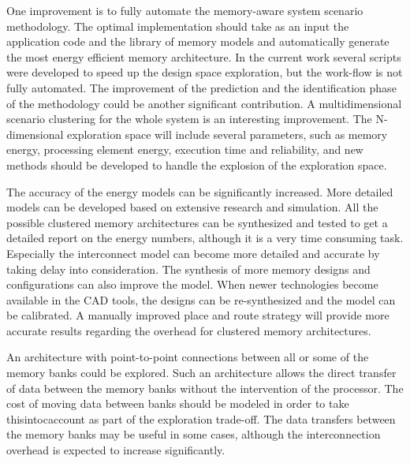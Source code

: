 One improvement is to fully automate the memory-aware system scenario methodology.
The optimal implementation should take as an input the application code and the library of memory models and automatically generate the most energy efficient memory architecture.
In the current work several scripts were developed to speed up the design space exploration, but the work-flow is not fully automated.
The improvement of the prediction and the identification phase of the methodology could be another significant contribution. 
A multidimensional scenario clustering for the whole system is an interesting improvement.
The N-dimensional exploration space will include several parameters, such as memory energy, processing element energy, execution time and reliability, and new methods should be developed to handle the explosion of the exploration space.

The accuracy of the energy models can be significantly increased.
More detailed models can be developed based on extensive research and simulation.
All the possible clustered memory architectures can be synthesized and tested to get a detailed report on the energy numbers, although it is a very time consuming task.
Especially the interconnect model can become more detailed and accurate by taking delay into consideration.
The synthesis of more memory designs and configurations can also improve the model.
When newer technologies become available in the CAD tools, the designs can be re-synthesized and the model can be calibrated.
A manually improved place and route strategy will provide more accurate results regarding the overhead for clustered memory architectures.

An architecture with point-to-point connections between all or some of the memory banks could be explored. 
Such an architecture allows the direct transfer of data between the memory banks without the intervention of the processor.
The cost of moving data between banks should be modeled
in order to take thisintocaccount as part of the exploration trade-off.
The data transfers between the memory banks may be useful in some cases, although the interconnection overhead is expected to increase significantly.


%
%
